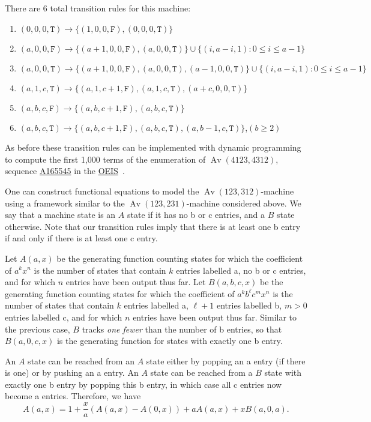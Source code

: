 \documentclass[10pt]{article}
\newcommand{\false}{\texttt{F}}
\newcommand{\true}{\texttt{T}}
\theoremstyle{plain}
\theoremstyle{definition}
\newcommand{\Av}{\operatorname{Av}}
\newcommand{\OEISlink}[1]{\href{http://oeis.org/#1}{#1}}
\newcommand{\OEISref}{\href{http://oeis.org/}{OEIS}~\cite{sloane:the-on-line-enc:}}
\newcommand{\OEIS}[1]{sequence \OEISlink{#1} in the \OEISref}
\begin{document}
There are $6$ total transition rules for this machine:
\begin{enumerate}
	\item $(0, 0, 0, \true) \longrightarrow \{(1, 0, 0, \false), (0, 0, 0, \true)\}$
	\item $(a, 0, 0, \false) \longrightarrow \{(a+1, 0, 0, \false), (a, 0, 0, \true)\} \cup \{(i, a-i, 1) : 0 \leq i \leq a-1\}$
	\item $(a, 0, 0, \true) \longrightarrow \{(a+1, 0, 0, \false), (a, 0, 0, \true), (a-1, 0, 0, \true)\} \cup \{(i, a-i, 1) : 0 \leq i \leq a-1\}$
 	\item $(a, 1, c, \true) \longrightarrow \{(a, 1, c+1, \false), (a, 1, c, \true), (a+c,0,0,\true)\}$
 	\item $(a, b, c, \false) \longrightarrow \{(a, b, c+1, \false), (a, b, c, \true)\}$
	\item $(a, b, c, \true) \longrightarrow \{(a, b, c+1, \false), (a, b, c, \true), (a, b-1, c, \true)\}$,\quad $(b \geq 2)$
\end{enumerate}
As before these transition rules can be implemented with dynamic programming to compute the first 1,000 terms of the enumeration of $\Av(4123,4312)$, \OEIS{A165545}.

One can construct functional equations to model the $\Av(123,312)$-machine using a framework similar to the $\Av(123,231)$-machine considered above. We say that a machine state is an $A$ state if it has no \textsf{b} or \textsf{c} entries, and a $B$ state otherwise. Note that our transition rules imply that there is at least one \textsf{b} entry if and only if there is at least one \textsf{c} entry.

Let $A(a,x)$ be the generating function counting states for which the coefficient of $a^kx^n$ is the number of states that contain $k$ entries labelled \textsf{a}, no \textsf{b} or \textsf{c} entries, and for which $n$ entries have been output thus far. Let $B(a,b,c,x)$ be the generating function counting states for which the coefficient of $a^k b^\ell c^m x^n$ is the number of states that contain $k$ entries labelled \textsf{a}, $\ell+1$ entries labelled \textsf{b}, $m>0$ entries labelled \textsf{c}, and for which $n$ entries have been output thus far. Similar to the previous case, $B$ tracks \emph{one fewer} than the number of \textsf{b} entries, so that $B(a,0,c,x)$ is the generating function for states with exactly one \textsf{b} entry.

An $A$ state can be reached from an $A$ state either by popping an \textsf{a} entry (if there is one) or by pushing an \textsf{a} entry. An $A$ state can be reached from a $B$ state with exactly one \textsf{b} entry by popping this \textsf{b} entry, in which case all \textsf{c} entries now become \textsf{a} entries. Therefore, we have
\[
	A(a,x) = 1 + \frac{x}{a}(A(a,x) - A(0,x)) + aA(a,x) + xB(a,0,a).
\]
\end{document}
